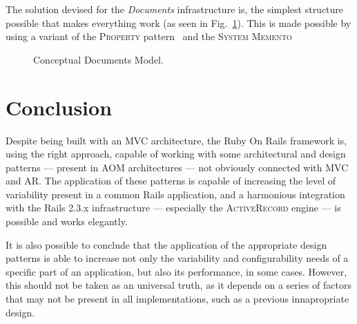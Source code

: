 \documentclass[9pt,a4paper]{extarticle}
\begin{document}
\begin{multicols}{2}
The solution devised for the \emph{Documents} infrastructure is, the simplest structure possible that makes everything work (as seen in Fig.~\ref{fig:documents_conceptual}). This is made possible by using a variant of the \textsc{Property} pattern~\cite{metadata_and_active_object_models} and the \textsc{System Memento}~\cite{patterns_data_and_metadata_evolution_in_aoms}

\begin{figure}[H]
  \caption{Conceptual Documents Model.}
  \label{fig:documents_conceptual}
\end{figure}

\section{Conclusion}\label{sec:conclusion}

Despite being built with an MVC architecture, the Ruby On Rails framework is, using the right approach, capable of working with some architectural and design patterns --- present in AOM architectures --- not obviously connected with MVC and AR. The application of these patterns is capable of increasing the level of variability present in a common Rails application, and a harmonious integration with the Rails 2.3.x infrastructure --- especially the \textsc{ActiveRecord} engine --- is possible and works elegantly.

It is also possible to conclude that the application of the appropriate design patterns is able to increase not only the variability and configurability needs of a specific part of an application, but also its performance, in some cases. However, this should not be taken as an universal truth, as it depends on a series of factors that may not be present in all implementations, such as a previous innapropriate design.



\end{multicols}
\end{document}
